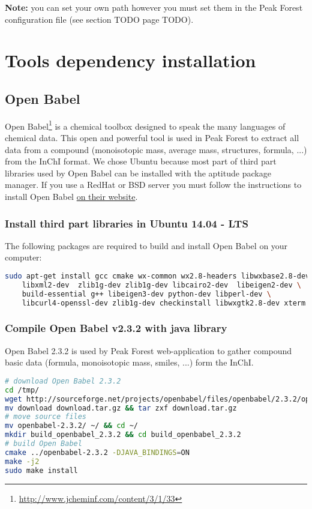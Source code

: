\textbf{Note:} you can set your own path however you must set them in the Peak Forest configuration file (see section TODO page TODO).

\section{Tools dependency installation}

\subsection{Open Babel}
\label{insallOpenBabel}
Open Babel\footnote{\url{http://www.jcheminf.com/content/3/1/33}} is a chemical toolbox designed to speak the many languages of chemical data. 
This open and powerful tool is used in Peak Forest to extract all data from a compound (monoisotopic mass, average mass, structures, formula, ...) from the InChI format. 
We chose Ubuntu because most part of third part libraries used by Open Babel can be installed with the aptitude package manager. 
If you use a RedHat or BSD server you must follow the instructions to install Open Babel \href{http://openbabel.org/docs/dev/Installation/install.html}{on their website}.

\subsubsection{Install third part libraries in Ubuntu 14.04 - LTS}

The following packages are required to build and install Open Babel on your computer:
\begin{lstlisting}[language=bash,caption={Install packages},frame=bt]
sudo apt-get install gcc cmake wx-common wx2.8-headers libwxbase2.8-dev libxml2 \
	libxml2-dev  zlib1g-dev zlib1g-dev libcairo2-dev  libeigen2-dev \
	build-essential g++ libeigen3-dev python-dev libperl-dev \
	libcurl4-openssl-dev zlib1g-dev checkinstall libwxgtk2.8-dev xterm git
\end{lstlisting}

\subsubsection{Compile Open Babel v2.3.2 with java library}

Open Babel 2.3.2 is used by Peak Forest web-application to gather compound basic data (formula, monoisotopic mass, smiles, ...) form the InChI. 
\begin{lstlisting}[language=bash,caption={Install Open Babel 2.3.2 with java library},frame=bt]
# download Open Babel 2.3.2
cd /tmp/
wget http://sourceforge.net/projects/openbabel/files/openbabel/2.3.2/openbabel-2.3.2.tar.gz/download
mv download download.tar.gz && tar zxf download.tar.gz 
# move source files 
mv openbabel-2.3.2/ ~/ && cd ~/
mkdir build_openbabel_2.3.2 && cd build_openbabel_2.3.2
# build Open Babel
cmake ../openbabel-2.3.2 -DJAVA_BINDINGS=ON
make -j2
sudo make install
\end{lstlisting}


